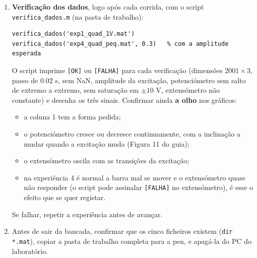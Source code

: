 \documentclass[a4paper,11pt]{article}
\begin{document}
\begin{enumerate}[label=$\square$, leftmargin=1.5em]
  \item \textbf{Verificação dos dados}, logo após cada corrida, com o script \texttt{verifica\_dados.m} (na pasta de trabalho):
  \begin{verbatim}
verifica_dados('exp1_quad_1V.mat')
verifica_dados('exp4_quad_peq.mat', 0.3)   % com a amplitude esperada
  \end{verbatim}
  O script imprime \texttt{[OK]} ou \texttt{[FALHA]} para cada verificação (dimensões $2001 \times 3$, passo de $0.02$ s, sem NaN, amplitude da excitação, potenciómetro sem salto de extremo a extremo, sem saturação em $\pm 10$ V, extensómetro não constante) e desenha os três sinais.
  Confirmar ainda \textbf{a olho} nos gráficos:
  \begin{itemize}
    \item a coluna 1 tem a forma pedida;
    \item o potenciómetro cresce ou decresce continuamente, com a inclinação a mudar quando a excitação muda (Figura 11 do guia);
    \item o extensómetro oscila com as transições da excitação;
    \item na experiência 4 é normal a barra mal se mover e o extensómetro quase não responder (o script pode assinalar \texttt{[FALHA]} no extensómetro), é esse o efeito que se quer registar.
  \end{itemize}
  Se falhar, repetir a experiência antes de avançar.

  \item Antes de sair da bancada, confirmar que os cinco ficheiros existem (\texttt{dir *.mat}), copiar a pasta de trabalho completa para a pen, e apagá-la do PC do laboratório.
\end{enumerate}
\end{document}
